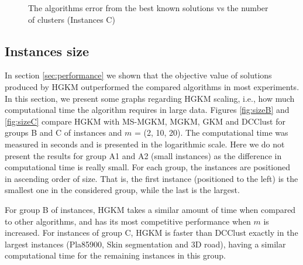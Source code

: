 \begin{figure}[H]
\centering
{}
\caption{The algorithms error from the best known solutions vs the number of clusters (Instances C)}
\label{fig:errorC}
\end{figure}

\subsection{Instances size}
In section \ref{sec:performance} we shown that the objective value of solutions produced by HGKM outperformed the compared algorithms in most experiments. In this section, we present some graphs regarding HGKM scaling, i.e., how much computational time the algorithm requires in large data. Figures \ref{fig:sizeB} and \ref{fig:sizeC} compare HGKM with MS-MGKM, MGKM, GKM and DCClust for groups B and C of instances and $m$ = (2, 10, 20). The computational time was measured in seconds and is presented in the logarithmic scale. Here we do not present the results for group A1 and A2 (small instances) as the difference in computational time is really small. For each group, the instances are positioned in ascending order of size. That is, the first instance (positioned to the left) is the smallest one in the considered group, while the last is the largest.

For group B of instances, HGKM takes a similar amount of time when compared to other algorithms, and has its most competitive performance when $m$ is increased. For instances of group C, HGKM is faster than DCClust exactly in the largest instances (Pla85900, Skin segmentation and 3D road), having a similar computational time for the remaining instances in this group.


